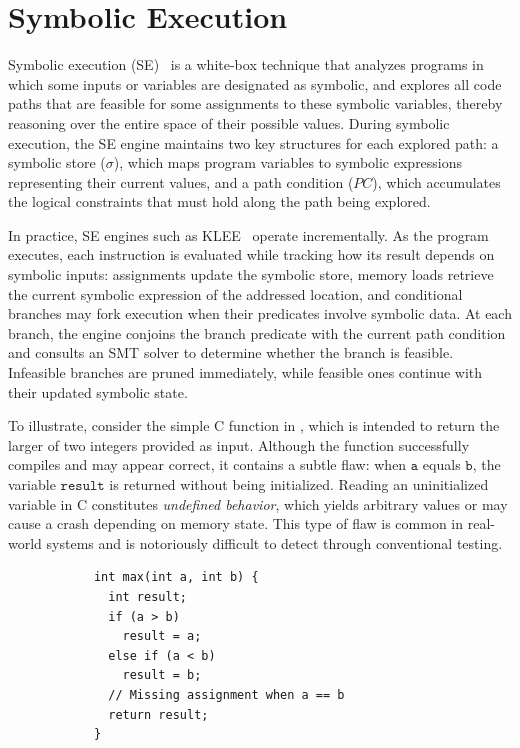 \section{Symbolic Execution}
Symbolic execution (SE)~\cite{King@CACM-76} is a white-box technique that analyzes programs in which some inputs or variables are designated as symbolic, and explores all code paths that are feasible for some assignments to these symbolic variables, thereby reasoning over the entire space of their possible values.
During symbolic execution, the SE engine maintains two key structures for each explored path: a symbolic store ($\mathtt{\sigma}$), which maps program variables to symbolic expressions representing their current values, and a path condition ($\mathit{PC}$), which accumulates the logical constraints that must hold along the path being explored.

In practice, SE engines such as KLEE~\cite{KLEE@OSDI-08} operate incrementally. 
As the program executes, each instruction is evaluated while tracking how its result depends on symbolic inputs: assignments update the symbolic store, memory loads retrieve the current symbolic expression of the addressed location, and conditional branches may fork execution when their predicates involve symbolic data.
At each branch, the engine conjoins the branch predicate with the current path condition and consults an SMT solver to determine whether the branch is feasible.
Infeasible branches are pruned immediately, while feasible ones continue with their updated symbolic state.

To illustrate, consider the simple C function in , which is intended to return the larger of two integers provided as input.
Although the function successfully compiles and may appear correct, it contains a subtle flaw: when $\mathtt{a}$ equals $\mathtt{b}$, the variable $\mathtt{result}$ is returned without being initialized. 
Reading an uninitialized variable in C constitutes \emph{undefined behavior}, which yields arbitrary values or may cause a crash depending on memory state.
This type of flaw is common in real-world systems and is notoriously difficult to detect through conventional testing.
\smallskip
\begin{listing}[ht]
	\centering
	\begin{minipage}{0.75\linewidth}
		\begin{verbatim}
			int max(int a, int b) {
			  int result;
			  if (a > b)
			    result = a;
			  else if (a < b)
			    result = b;
			  // Missing assignment when a == b
			  return result;
			}
		\end{verbatim}
	\end{minipage}
	\caption{Function returning the maximum of two integers.}
	\label{lst:max-func}
\end{listing}
\smallskip

